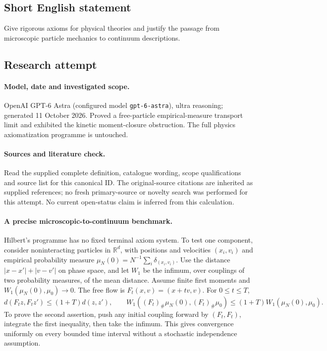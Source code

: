 \documentclass[11pt]{article}
\begin{document}
\subsection{Short English statement}
Give rigorous axioms for physical theories and justify the passage from microscopic particle mechanics to continuum descriptions.
\subsection{Research attempt}
\paragraph{Model, date and investigated scope.}
OpenAI GPT-6 Astra (configured model \texttt{gpt-6-astra}), ultra reasoning; generated 11 October 2026. Proved a free-particle empirical-measure transport limit and exhibited the kinetic moment-closure obstruction. The full physics axiomatization programme is untouched.

\paragraph{Sources and literature check.}
Read the supplied complete definition, catalogue wording, scope qualifications and source list for this canonical ID. The original-source citations are inherited as supplied references; no fresh primary-source or novelty search was performed for this attempt. No current open-status claim is inferred from this calculation.

\paragraph{A precise microscopic-to-continuum benchmark.}Hilbert's programme has no fixed terminal axiom system. To test one component, consider noninteracting particles in \(\mathbb R^d\), with positions and velocities \((x_i,v_i)\) and empirical probability measure \(\mu_N(0)=N^{-1}\sum_i\delta_{(x_i,v_i)}\). Use the distance \(|x-x'|+|v-v'|\) on phase space, and let \(W_1\) be the infimum, over couplings of two probability measures, of the mean distance. Assume finite first moments and \(W_1(\mu_N(0),\mu_0)\to0\). The free flow is \(F_t(x,v)=(x+tv,v)\). For \(0\le t\le T\),
\[d(F_tz,F_tz')\le(1+T)d(z,z'),\qquad
W_1((F_t)_\#\mu_N(0),(F_t)_\#\mu_0)\le(1+T)W_1(\mu_N(0),\mu_0).\]
To prove the second assertion, push any initial coupling forward by \((F_t,F_t)\), integrate the first inequality, then take the infimum. This gives convergence uniformly on every bounded time interval without a stochastic independence assumption.
\end{document}
